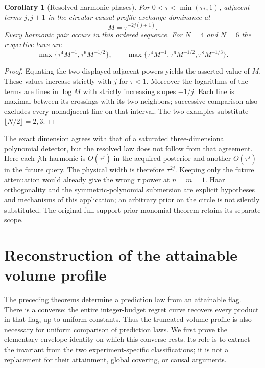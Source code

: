 \documentclass[11pt]{amsart}
\newtheorem{corollary}[theorem]{Corollary}
\theoremstyle{definition}\newtheorem{definition}[theorem]{Definition}
\theoremstyle{remark}\newtheorem{remark}[theorem]{Remark}
\begin{document}
\begin{corollary}[Resolved harmonic phases]\label{cor:circle-phases}
For $0<\tau<\min(\tau_*,1)$, adjacent terms $j,j+1$ in the circular
causal profile exchange dominance at
\[
 M=\tau^{-2j(j+1)}.
\]
Every harmonic pair occurs in this ordered sequence. For $N=4$ and $N=6$
the respective laws are
\[
 \max\{\tau^4M^{-1},\tau^6M^{-1/2}\},\qquad
 \max\{\tau^4M^{-1},\tau^6M^{-1/2},\tau^8M^{-1/3}\}.
\]
\end{corollary}
\begin{proof}
Equating the two displayed adjacent powers yields the asserted value of
$M$. These values increase strictly with $j$ for $\tau<1$. Moreover
the logarithms of the terms are lines in $\log M$ with strictly
increasing slopes $-1/j$. Each line is maximal between its crossings
with its two neighbors; successive comparison also excludes every
nonadjacent line on that interval. The two examples substitute
$\lfloor N/2\rfloor=2,3$.
\end{proof}

The exact dimension agrees with that of a saturated three-dimensional
polynomial detector, but the resolved law does not follow from that
agreement. Here each $j$th harmonic is $O(\tau^j)$ in the acquired
posterior and another $O(\tau^j)$ in the future query. The physical
width is therefore $\tau^{2j}$. Keeping only the future attenuation
would already give the wrong $\tau$ power at $n=m=1$. Haar orthogonality
and the symmetric-polynomial submersion are explicit hypotheses and
mechanisms of this application; an arbitrary prior on the circle is not
silently substituted. The original full-support-prior monomial theorem
retains its separate scope.

\section{Reconstruction of the attainable volume profile}
\label{sec:operational-reconstruction}
The preceding theorems determine a prediction law from an attainable
flag. There is a converse: the entire integer-budget regret curve
recovers every product in that flag, up to uniform constants. Thus the
truncated volume profile is also necessary for uniform comparison of
prediction laws. We first prove the elementary envelope identity on
which this converse rests. Its role is to extract the invariant from
the two experiment-specific classifications; it is not a replacement
for their attainment, global covering, or causal arguments.
\end{document}

